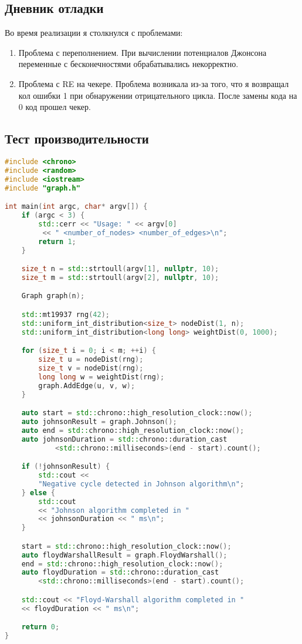 \documentclass[12pt]{article}
\begin{document}
\subsection*{Дневник отладки}

Во время реализации я столкнулся с проблемами:
\begin{enumerate}
    \item Проблема с переполнением. При вычислении потенциалов Джонсона переменные с бесконечностями обрабатывались некорректно.
    \item Проблема с RE на чекере. Проблема возникала из-за того, что я возвращал кол ошибки 1 при обнаружении отрицательного цикла. После замены кода на 0 код прошел чекер.
\end{enumerate}

\subsection*{Тест производительности}

\begin{lstlisting}[language=C++]
#include <chrono>
#include <random>
#include <iostream>
#include "graph.h"

int main(int argc, char* argv[]) {
    if (argc < 3) {
        std::cerr << "Usage: " << argv[0]
         << " <number_of_nodes> <number_of_edges>\n";
        return 1;
    }

    size_t n = std::strtoull(argv[1], nullptr, 10);
    size_t m = std::strtoull(argv[2], nullptr, 10);

    Graph graph(n);

    std::mt19937 rng(42);
    std::uniform_int_distribution<size_t> nodeDist(1, n);
    std::uniform_int_distribution<long long> weightDist(0, 1000);

    for (size_t i = 0; i < m; ++i) {
        size_t u = nodeDist(rng);
        size_t v = nodeDist(rng);
        long long w = weightDist(rng);
        graph.AddEdge(u, v, w);
    }

    auto start = std::chrono::high_resolution_clock::now();
    auto johnsonResult = graph.Johnson();
    auto end = std::chrono::high_resolution_clock::now();
    auto johnsonDuration = std::chrono::duration_cast
            <std::chrono::milliseconds>(end - start).count();

    if (!johnsonResult) {
        std::cout << 
        "Negative cycle detected in Johnson algorithm\n";
    } else {
        std::cout 
        << "Johnson algorithm completed in " 
        << johnsonDuration << " ms\n";
    }

    start = std::chrono::high_resolution_clock::now();
    auto floydWarshallResult = graph.FloydWarshall();
    end = std::chrono::high_resolution_clock::now();
    auto floydDuration = std::chrono::duration_cast
        <std::chrono::milliseconds>(end - start).count();

    std::cout << "Floyd-Warshall algorithm completed in " 
    << floydDuration << " ms\n";

    return 0;
}
\end{lstlisting}
\end{document}
